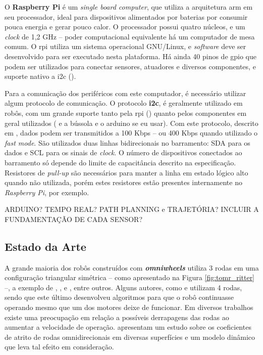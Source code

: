 
O \textbf{Raspberry Pi} é um \emph{single board computer}, que utiliza a arquitetura \acrshort{arm} em seu processador, ideal para dispositivos alimentados por baterias por consumir pouca energia e gerar pouco calor. O processador possui quatro núcleos, e um \emph{clock} de 1,2 GHz -- poder computacional equivalente há um computador de mesa comum. O \acrshort{rpi} utiliza um sistema operacional GNU/Linux, e \emph{software} deve ser desenvolvido para ser executado nesta plataforma. Há ainda 40 pinos de \acrshort{gpio} que podem ser utilizados para conectar sensores, atuadores e diversos componentes, e suporte nativo a \acrshort{i2c} (\cite{upton2014raspberry}).


Para a comunicação dos periféricos com este computador, é necessário utilizar algum protocolo de comunicação. O protocolo \textbf{\acrlong{i2c}}, é geralmente utilizado em robôs, com um grande suporte tanto pela \acrshort{rpi} (\cite{upton2014raspberry}) quanto pelos componentes em geral utilizados (\cite{MPU6050} e a bússola e o arduino se eu usar). Com este protocolo, descrito em \cite{semiconductors2000i2c}, dados podem ser transmitidos a 100 Kbps -- ou 400 Kbps quando utilizado o \emph{fast mode}. São utilizados duas linhas bidirecionais no barramento: SDA para os dados e SCL para os sinais de \emph{clock}. O número de dispositivos conectados ao barramento só depende do limite de capacitância descrito na especificação. Resistores de \emph{pull-up} são necessários para manter a linha em estado lógico alto quando não utilizada, porém estes resistores estão presentes internamente no \emph{Raspberry Pi}, por exemplo.

ARDUINO? TEMPO REAL? PATH PLANNING e TRAJETÓRIA? INCLUIR A FUNDAMENTAÇÃO DE CADA SENSOR?

\subsection{Estado da Arte}

A grande maioria dos robôs construídos com \textbf{\emph{omniwheels}} utiliza 3 rodas em uma configuração triangular simétrica -- como apresentado na Figura \ref{fig:tomr_ritter} --, a exemplo de \cite{ritter2016modelagem}, \cite{samani2007comprehensive}, \cite{williams2002dynamic} e \cite{indiveri2009swedish}, entre outros. Alguns autores, como \cite{krinkin2015design} e \cite{rojas2006holonomic} utilizam 4 rodas, sendo que este último desenvolveu algoritmos para que o robô continuasse operando mesmo que um dos motores deixe de funcionar. Em diversos trabalhos existe uma preocupação em relação a possíveis derrapagens das rodas ao aumentar a velocidade de operação. \cite{williams2002dynamic} apresentam um estudo sobre os coeficientes de atrito de rodas omnidirecionais em diversas superfícies e um modelo dinâmico que leva tal efeito em consideração.

